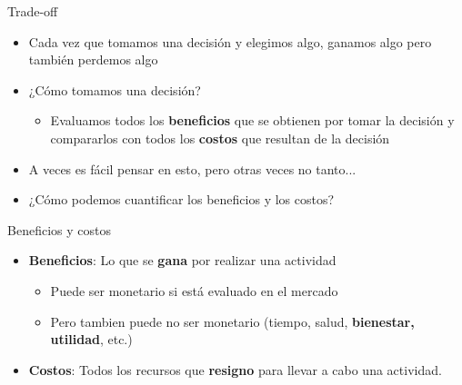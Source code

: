 \documentclass{beamer}
\begin{document}
\begin{frame}{Trade-off}
    \begin{itemize}
        \item Cada vez que tomamos una decisión y elegimos algo, ganamos algo pero también perdemos algo \vspace{2mm}
        \item ¿Cómo tomamos una decisión? 
        \begin{itemize}
            \item Evaluamos todos los \textbf{beneficios} que se obtienen por tomar la decisión y compararlos con todos los \textbf{costos} que resultan de la decisión
            \vspace{1mm}
        \end{itemize}
        \item A veces es fácil pensar en esto, pero otras veces no tanto...
        \item ¿Cómo podemos cuantificar los beneficios y los costos?
    \end{itemize} 
\end{frame}

\begin{frame}{Beneficios y costos}
    \begin{itemize}
        \item \textbf{Beneficios}: Lo que se \textbf{gana} por realizar una actividad
        \begin{itemize}
            \item Puede ser monetario si está evaluado en el mercado
            \item Pero tambien puede no ser monetario (tiempo, salud, \textbf{bienestar, utilidad}, etc.)
        \end{itemize}
        \item \textbf{Costos}: Todos los recursos que \textbf{resigno} para llevar a cabo una actividad.
    \end{itemize} 
\end{frame}
\end{document}
